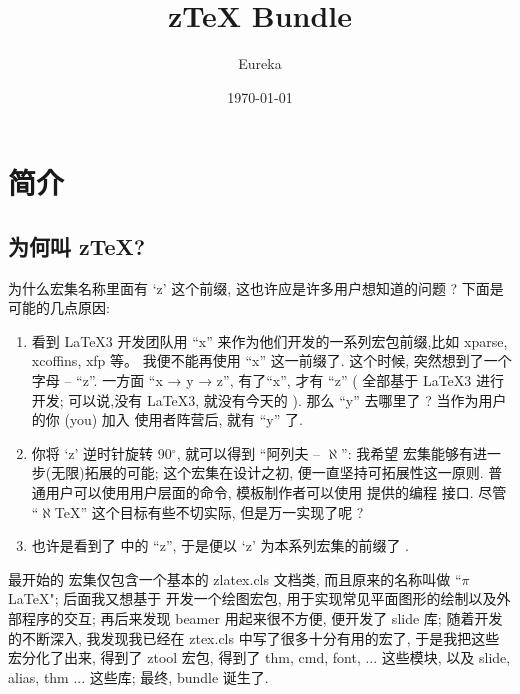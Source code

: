 \documentclass[
  hyper, lang=cn,
  mathSpec={envStyle=leftbar},
]{../../zlatex/code/ztex}
\title{z\TeX{} Bundle}
\author{Eureka}
\date{\today}
\newcommand{\pkg}[1]{\textsf{#1}}
\newcommand{\cls}[1]{\textsf{#1}}
\begin{document}
\ExplSyntaxOn
{}
\ExplSyntaxOff
\maketitle
\thispagestyle{empty}
\tableofcontents
\clearpage


\section{简介}
\subsection{为何叫 z\TeX{}?}
为什么宏集名称里面有 `z' 这个前缀, 这也许应是许多用户想知道的问题 ? 下面是可能的几点原因:

\begin{enumerate}[(1)]
  \item 看到 \LaTeX3 开发团队用 ``x'' 来作为他们开发的一系列宏包前缀,比如 \pkg{xparse}, \pkg{xcoffins}, \pkg{xfp} 等。
    我便不能再使用 ``x'' 这一前缀了. 这个时候, 突然想到了一个字母 -- ``z''. 一方面 ``x → y → z'', 有了``x'', 才有 ``z''
    (\zTeX{} 全部基于 \LaTeX3 进行开发; 可以说,没有 \LaTeX3, 就没有今天的 \zTeX{}). 那么 ``y'' 去哪里了 ? 当作为用户的你 (you) 
    加入 \zTeX{} 使用者阵营后, 就有 ``y'' 了.
  \item 你将 `z' 逆时针旋转 90$^\circ$, 就可以得到 ``阿列夫 -- $\aleph$'': 我希望 \zTeX{} 宏集能够有进一步(无限)拓展的可能;
    这个宏集在设计之初, 便一直坚持可拓展性这一原则. 普通用户可以使用用户层面的命令, 模板制作者可以使用 \ztex{} 提供的编程
    接口. 尽管 ``$\aleph$\TeX'' 这个目标有些不切实际, 但是万一实现了呢 ?
  \item 也许是看到了 \TikZ{} 中的 ``z'', 于是便以 `z' 为本系列宏集的前缀了 .
\end{enumerate}

最开始的 \ztex{} 宏集仅包含一个基本的 \cls{zlatex.cls} 文档类, 而且原来的名称叫做 ``$\pi$\LaTeX{}"; 后面我又想基于 \TikZ{} 
开发一个绘图宏包, 用于实现常见平面图形的绘制以及外部程序的交互; 再后来发现 beamer 用起来很不方便, 便开发了 \pkg{slide} 库;
随着开发的不断深入, 我发现我已经在 \cls{ztex.cls} 中写了很多十分有用的宏了, 于是我把这些宏分化了出来, 得到了 \pkg{ztool} 宏包,
得到了 \pkg{thm}, \pkg{cmd}, \pkg{font}, ... 这些模块, 以及 \pkg{slide}, \pkg{alias}, \pkg{thm} ... 这些库; 最终, 
\ztex{} bundle 诞生了.
\end{document}
